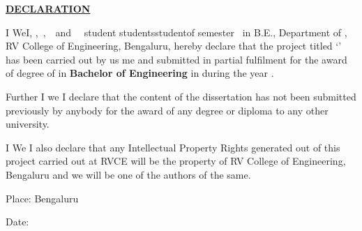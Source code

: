 
\thispagestyle{empty}

\begin{center}
\Large\textbf{\underline{DECLARATION}} \par
\end{center}


\noindent \ifPG I \else \ifStuNameBUsed We\else I\fi\fi, \textbf{\printStuNameA} \ifPG \else\ifStuNameBUsed  \ifStuNameCUsed ,$\,$ \fi \textbf{\printStuNameB} \ifStuNameCUsed  \ifStuNameDUsed ,$\,$ \fi \textbf{\printStuNameC}$\,$ \ifStuNameDUsed and $\,$ \textbf{\printStuNameD}$\,$ \fi \fi \fi \fi \ifPG student\; \else \ifStuNameBUsed students\;\else student\;\fi\fi of \ifPG {}  \fi \else {}\fi \fi semester \ifPG \printMastersInSF\, in \printMastersPrgName \else B.E.\fi, Department of \printDepartmentLF, RV College of Engineering, Bengaluru, hereby declare that the \fi project titled `\textbf{\printTitle}' has been carried out by \ifStuNameBUsed us \else me \fi and submitted in partial fulfilment for the award of degree of \ifPG \textbf{\printMastersInLF} in \textbf{\printMastersPrgName} \else\textbf{Bachelor of Engineering} in \textbf{\printDepartmentLF} \fi during the year \printAcadYear.\\ \par

\noindent Further \ifPG I \else\ifStuNameBUsed we \else I \fi \fi declare that the content of the dissertation has not been submitted previously by anybody for the award of any degree or diploma to any other university.\\ \par

\noindent \ifPG I \else\ifStuNameBUsed We \else I \fi \fi also declare that any Intellectual Property Rights generated out of this project carried out at RVCE will be the property of RV College of Engineering, Bengaluru and we will be one of the authors of the same.

\vspace{1cm}
\noindent Place: Bengaluru\par
\vspace{0.5cm}
\noindent Date: \par

